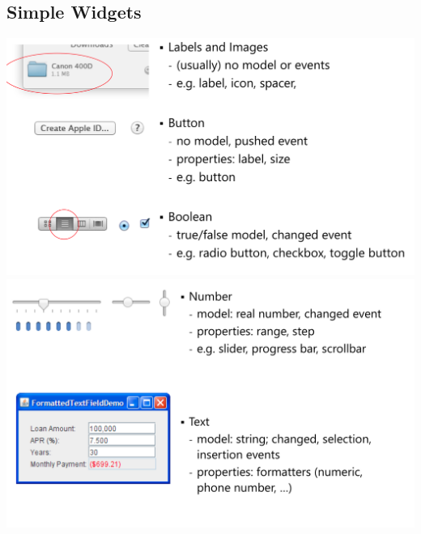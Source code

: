 \documentclass[twoside]{article}
\begin{document}
\subsection{Simple Widgets}
\begin{center}
\includegraphics[scale=0.2]{16}\\
\includegraphics[scale=0.2]{17}\\
\end{center}
\end{document}
